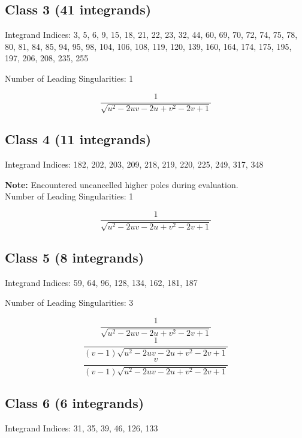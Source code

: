 \documentclass[11pt,a4paper]{article}
\begin{document}
\subsection*{Class 3 (41 integrands)}
Integrand Indices: 3, 5, 6, 9, 15, 18, 21, 22, 23, 32, 44, 60, 69, 70, 72, 74, 75, 78, 80, 81, 84, 85, 94, 95, 98, 104, 106, 108, 119, 120, 139, 160, 164, 174, 175, 195, 197, 206, 208, 235, 255

Number of Leading Singularities: 1

\begin{equation}
\frac{1}{\sqrt{u^2-2 u v-2 u+v^2-2 v+1}}
\end{equation}


\subsection*{Class 4 (11 integrands)}
Integrand Indices: 182, 202, 203, 209, 218, 219, 220, 225, 249, 317, 348

\textbf{Note:} Encountered uncancelled higher poles during evaluation.\\[1em]

Number of Leading Singularities: 1

\begin{equation}
\frac{1}{\sqrt{u^2-2 u v-2 u+v^2-2 v+1}}
\end{equation}


\subsection*{Class 5 (8 integrands)}
Integrand Indices: 59, 64, 96, 128, 134, 162, 181, 187

Number of Leading Singularities: 3

\begin{equation}
\frac{1}{\sqrt{u^2-2 u v-2 u+v^2-2 v+1}}
\end{equation}
\begin{equation}
\frac{1}{(v-1) \sqrt{u^2-2 u v-2 u+v^2-2 v+1}}
\end{equation}
\begin{equation}
\frac{v}{(v-1) \sqrt{u^2-2 u v-2 u+v^2-2 v+1}}
\end{equation}


\subsection*{Class 6 (6 integrands)}
Integrand Indices: 31, 35, 39, 46, 126, 133
\end{document}
